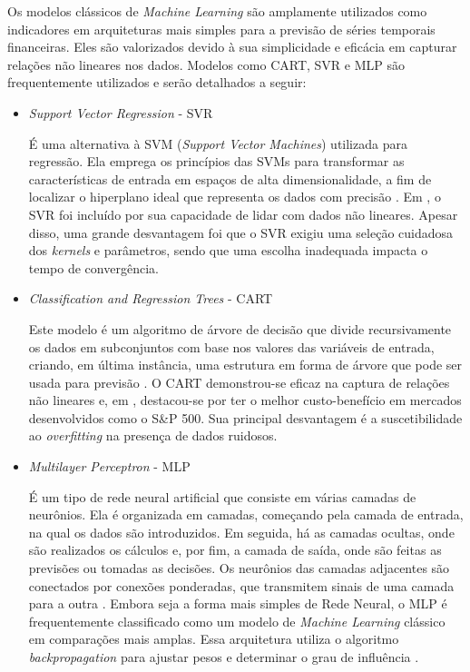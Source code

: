 Os modelos clássicos de \textit{Machine Learning} são amplamente utilizados como indicadores em arquiteturas mais simples para a previsão de séries temporais financeiras. Eles são valorizados devido à sua simplicidade e eficácia em capturar relações não lineares nos dados. Modelos como CART, SVR e MLP são frequentemente utilizados e serão detalhados a seguir:

\begin{itemize}
    \item \textit{Support Vector Regression} - SVR

    É uma alternativa à SVM (\textit{Support Vector Machines}) utilizada para regressão. Ela emprega os princípios das SVMs para transformar as características de entrada em espaços de alta dimensionalidade, a fim de localizar o hiperplano ideal que representa os dados com precisão \cite{site1}. Em , o SVR foi incluído por sua capacidade de lidar com dados não lineares. Apesar disso, uma grande desvantagem foi que o SVR exigiu uma seleção cuidadosa dos \textit{kernels} e parâmetros, sendo que uma escolha inadequada impacta o tempo de convergência.

    \item \textit{Classification and Regression Trees} - CART

    Este modelo é um algoritmo de árvore de decisão que divide recursivamente os dados em subconjuntos com base nos valores das variáveis de entrada, criando, em última instância, uma estrutura em forma de árvore que pode ser usada para previsão \cite{site2}. O CART demonstrou-se eficaz na captura de relações não lineares e, em , destacou-se por ter o melhor custo-benefício em mercados desenvolvidos como o S\&P 500. Sua principal desvantagem é a suscetibilidade ao \textit{overfitting} na presença de dados ruidosos.

    \item \textit{Multilayer Perceptron} - MLP

    É um tipo de rede neural artificial que consiste em várias camadas de neurônios. Ela é organizada em camadas, começando pela camada de entrada, na qual os dados são introduzidos. Em seguida, há as camadas ocultas, onde são realizados os cálculos e, por fim, a camada de saída, onde são feitas as previsões ou tomadas as decisões. Os neurônios das camadas adjacentes são conectados por conexões ponderadas, que transmitem sinais de uma camada para a outra \cite{site3}. Embora seja a forma mais simples de Rede Neural, o MLP é frequentemente classificado como um modelo de \textit{Machine Learning} clássico em comparações mais amplas. Essa arquitetura utiliza o algoritmo \textit{backpropagation} para ajustar pesos e determinar o grau de influência \cite{Giacomel2016MetodoAlgoritmico}.

\end{itemize}

